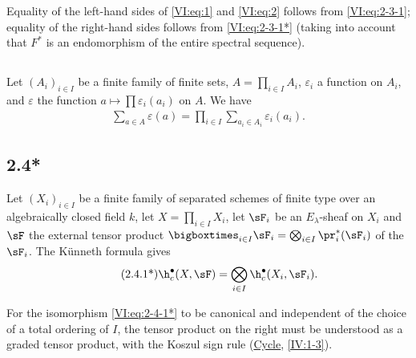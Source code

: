 Equality of the left-hand sides of \eqref{VI:eq:1} and \eqref{VI:eq:2} 
follows from \eqref{VI:eq:2-3-1}; equality of the right-hand sides follows from 
\eqref{VI:eq:2-3-1*} (taking into account that $F^\ast$ is an endomorphism of 
the entire spectral sequence). 





\subsection{}\label{VI:2-4}

Let $(A_i)_{i\in I}$ be a finite family of finite sets, 
$A=\prod_{i\in I} A_i$, $\varepsilon_i$ a function on $A_i$, and 
$\varepsilon$ the function $a\mapsto \prod \varepsilon_i(a_i)$ on $A$. We have 
\begin{align*}\tag{2.4.1}\label{VI:eq:2-4-1}
  \sum_{a\in A} \varepsilon(a) = \prod_{i\in I} \sum_{a_i\in A_i} \varepsilon_i(a_i) \text{.}
\end{align*}





\subsection*{2.4*}\label{VI:2-4*}

Let $(X_i)_{i\in I}$ be a finite family of separated schemes of finite type 
over an algebraically closed field $k$, let $X=\prod_{i\in I} X_i$, let $\sF_i$ be an 
$E_\lambda$-sheaf on $X_i$ and $\sF$ the external tensor product 
$\bigboxtimes_{i\in I}\sF_i = \bigotimes_{i\in I} \pr_i^\ast(\sF_i)$ 
of the $\sF_i$. 
The K\"unneth formula gives 
\begin{align*}\tag{2.4.1*}\label{VI:eq:2-4-1*}
  \h_c^\bullet(X,\sF) = \bigotimes_{i\in I} \h_c^\bullet(X_i,\sF_i) \text{.}
\end{align*}

For the isomorphism \eqref{VI:eq:2-4-1*} to be canonical and independent of 
the choice of a total ordering of $I$, the tensor product on the right must be 
understood as a graded tensor product, with the Koszul sign rule 
(\hyperref[IV]{Cycle}, \ref{IV:1-3}). 





\subsection{}\label{VI:2-5}

